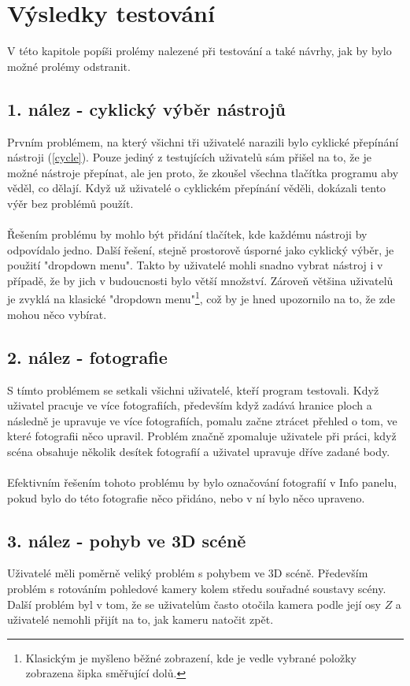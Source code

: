 \documentclass[11pt,twoside,a4paper]{book}
\begin{document}
\section{Výsledky testování}
V této kapitole popíši prolémy nalezené při testování a také návrhy, jak by bylo možné prolémy odstranit.

\subsection{1. nález - cyklický výběr nástrojů}
Prvním problémem, na který všichni tři uživatelé narazili bylo cyklické přepínání nástroji (\ref{cycle}). Pouze jediný z testujících uživatelů sám přišel na to, že je možné nástroje přepínat, ale jen proto, že zkoušel všechna tlačítka programu aby věděl, co dělají. Když už uživatelé o cyklickém přepínání věděli, dokázali tento výěr bez problémů použít.
\paragraph{}
Řešením problému by mohlo být přidání tlačítek, kde každému nástroji by odpovídalo jedno. Další řešení, stejně prostorově úsporné jako cyklický výběr, je použití "dropdown menu". Takto by uživatelé mohli snadno vybrat nástroj i v případě, že by jich v budoucnosti bylo větší množství. Zároveň většina uživatelů je zvyklá na klasické "dropdown menu"\footnote{Klasickým je myšleno běžné zobrazení, kde je vedle vybrané položky zobrazena šipka směřující dolů. }, což by je hned upozornilo na to, že zde mohou něco vybírat.

\subsection{2. nález - fotografie}
S tímto problémem se setkali všichni uživatelé, kteří program testovali. Když uživatel pracuje ve více fotografiích, především když zadává hranice ploch a následně je upravuje ve více fotografiích, pomalu začne ztrácet přehled o tom, ve které fotografii něco upravil. Problém značně zpomaluje uživatele při práci, když scéna obsahuje několik desítek fotografií a uživatel upravuje dříve zadané body. 
\paragraph{}
Efektivním řešením tohoto problému by bylo označování fotografií v Info panelu, pokud bylo do této fotografie něco přidáno, nebo v ní bylo něco upraveno. 

\subsection{3. nález - pohyb ve 3D scéně}
Uživatelé měli poměrně veliký problém s pohybem ve 3D scéně. Především problém s rotováním pohledové kamery kolem středu souřadné soustavy scény. Další problém byl v tom, že se uživatelům často otočila kamera podle její osy $Z$ a uživatelé nemohli přijít na to, jak kameru natočit zpět.
\end{document}
